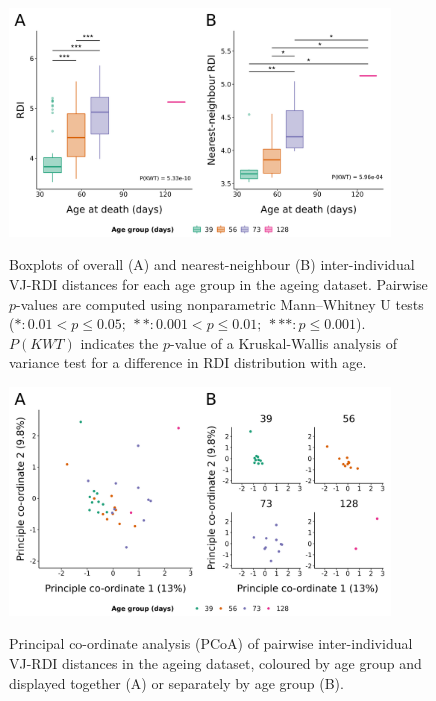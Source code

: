 \begin{figure}
\centering
\includegraphics[width = 0.9\textwidth]{_Figures/png/ageing-rdi-VJ-individual-groupdist}
\begin{subfigure}{0em}
\label{fig:igseq-ageing-rdi-VJ-individual-groupdist-all}
\end{subfigure}
\begin{subfigure}{0em}
\label{fig:igseq-ageing-rdi-VJ-individual-groupdist-nn}
\end{subfigure}
\caption{Boxplots of overall (A) and nearest-neighbour (B) inter-individual VJ-RDI distances for each age group in the \igseq ageing dataset. Pairwise $p$-values are computed using nonparametric Mann–Whitney U tests ($*: 0.01 < p \leq 0.05;~**: 0.001 < p \leq 0.01;~***: p \leq 0.001$). $P(KWT)$ indicates the $p$-value of a Kruskal-Wallis analysis of variance test for a difference in RDI distribution with age.}
\label{fig:igseq-ageing-rdi-VJ-individual-groupdist}
\end{figure}

\begin{figure}
\centering
\includegraphics[width = 0.9\textwidth]{_Figures/png/ageing-rdi-VJ-individual-pcoa}
\begin{subfigure}{0em}
\label{fig:igseq-ageing-rdi-VJ-individual-pcoa-all}
\end{subfigure}
\begin{subfigure}{0em}
\label{fig:igseq-ageing-rdi-VJ-individual-pcoa-facet}
\end{subfigure}
\caption{Principal co-ordinate analysis (PCoA) of pairwise inter-individual VJ-RDI distances in the \igseq ageing dataset, coloured by age group and displayed together (A) or separately by age group (B).}
\label{fig:igseq-ageing-rdi-VJ-individual-pcoa}
\end{figure}

